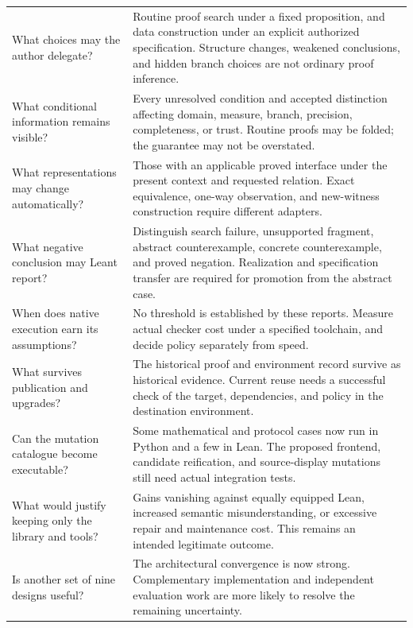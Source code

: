 \documentclass[11pt,letterpaper]{article}
\theoremstyle{definition}\newtheorem{definition}[proposition]{Definition}
\theoremstyle{remark}\newtheorem{remark}[proposition]{Remark}
\begin{document}
\begin{center}
\begin{longtable}{@{}P{0.30\textwidth}P{0.62\textwidth}@{}}
What choices may the author delegate? & Routine proof search under a fixed proposition, and data construction under an explicit authorized specification. Structure changes, weakened conclusions, and hidden branch choices are not ordinary proof inference.\\
What conditional information remains visible? & Every unresolved condition and accepted distinction affecting domain, measure, branch, precision, completeness, or trust. Routine proofs may be folded; the guarantee may not be overstated.\\
What representations may change automatically? & Those with an applicable proved interface under the present context and requested relation. Exact equivalence, one-way observation, and new-witness construction require different adapters.\\
What negative conclusion may Leant report? & Distinguish search failure, unsupported fragment, abstract counterexample, concrete counterexample, and proved negation. Realization and specification transfer are required for promotion from the abstract case.\\
When does native execution earn its assumptions? & No threshold is established by these reports. Measure actual checker cost under a specified toolchain, and decide policy separately from speed.\\
What survives publication and upgrades? & The historical proof and environment record survive as historical evidence. Current reuse needs a successful check of the target, dependencies, and policy in the destination environment.\\
Can the mutation catalogue become executable? & Some mathematical and protocol cases now run in Python and a few in Lean. The proposed frontend, candidate reification, and source-display mutations still need actual integration tests.\\
What would justify keeping only the library and tools? & Gains vanishing against equally equipped Lean, increased semantic misunderstanding, or excessive repair and maintenance cost. This remains an intended legitimate outcome.\\
Is another set of nine designs useful? & The architectural convergence is now strong. Complementary implementation and independent evaluation work are more likely to resolve the remaining uncertainty.\\
\end{longtable}
\end{center}
\end{document}
